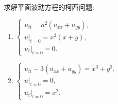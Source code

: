 \begin{exercise}
  求解平面波动方程的柯西问题:
  \begin{enumerate}[(1)]
    \item $\begin{cases}
            u_{tt} = a^2(u_{xx}+u_{yy}), \\
            u|_{t=0}=x^2(x+y), \\
            u_t|_{t=0}=0.
          \end{cases}$
    \item $\begin{cases}
            u_{tt} - 3(u_{xx}+u_{yy}) = x^3+y^3, \\
            u|_{t=0}=0, \\
            u_t|_{t=0}=x^2.
          \end{cases}$
  \end{enumerate}
\end{exercise}


